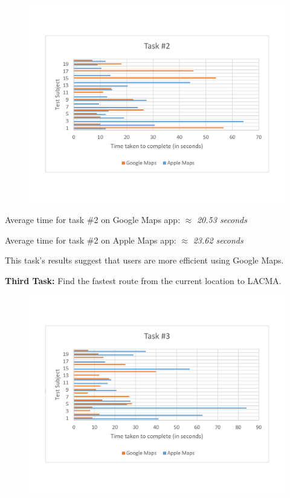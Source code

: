 \documentclass[a4paper; 11pt]{article}
\begin{document}
\begin{figure}[ht]
\begin{center}
\vspace{-.5in}
\includegraphics[keepaspectratio, width=.8\textwidth ]{task2.pdf}
\end{center}
\end{figure}
\begin{center}
\vspace{-.6in}
\par
Average time for task \#2 on Google Maps app: $ \approx $ \textit{20.53 seconds}
\par
Average time for task \#2 on Apple Maps app: $ \approx $ \textit{23.62 seconds}
\end{center}
\par
\noindent
This task's results suggest that users are more efficient using Google Maps. 
\medskip
\medskip
\par
\noindent
\textbf{Third Task: }Find the fastest route from the current location to LACMA.
\begin{figure}[ht]
\begin{center}
\vspace{-.4in}
\includegraphics[keepaspectratio, width=.8\textwidth ]{task3.pdf}
\end{center}
\end{figure}
\end{document}
